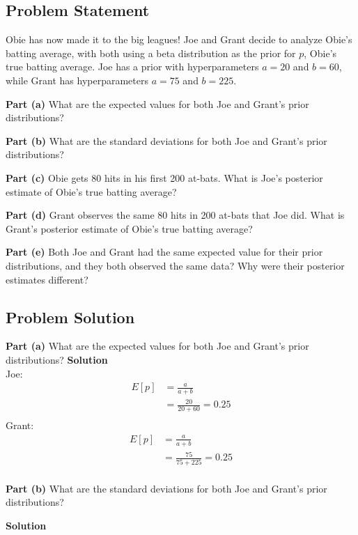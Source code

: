 \documentclass[12pt]{article}
\theoremstyle{definition}
\begin{document}
\subsection*{Problem Statement}

Obie has now made it to the big leagues! Joe and Grant decide to analyze Obie's batting average, with both using a beta distribution as the prior for $p$, Obie's true batting average. Joe has a prior with hyperparameters $a = 20$ and $b = 60$, while Grant has hyperparameters $a = 75$ and $b = 225$.

\bigskip
\noindent
{\bf Part (a)} What are the expected values for both Joe and Grant's prior distributions?

\bigskip
\noindent
{\bf Part (b)} What are the standard deviations for both Joe and Grant's prior distributions?

\bigskip
\noindent
{\bf Part (c)} Obie gets 80 hits in his first 200 at-bats. What is Joe's posterior estimate of Obie's true batting average?

\bigskip
\noindent
{\bf Part (d)} Grant observes the same 80 hits in 200 at-bats that Joe did. What is Grant's posterior estimate of Obie's true batting average?

\bigskip
\noindent
{\bf Part (e)} Both Joe and Grant had the same expected value for their prior distributions, and they both observed the same data? Why were their posterior estimates different?


\newpage
\subsection*{Problem Solution}
\bigskip
\noindent
{\bf Part (a)} What are the expected values for both Joe and Grant's prior distributions?
\bigskip
\noindent
{\bf Solution}\\
Joe:
\begin{align*}
E[p] &= \frac{a}{a + b}\\
&= \frac{20}{20 + 60} = 0.25\\
\end{align*}
Grant:
\begin{align*}
E[p] &= \frac{a}{a + b}\\
&= \frac{75}{75 + 225} = 0.25\\
\end{align*}


\noindent
{\bf Part (b)} What are the standard deviations for both Joe and Grant's prior distributions?

\bigskip
\noindent
{\bf Solution} 
\end{document}
